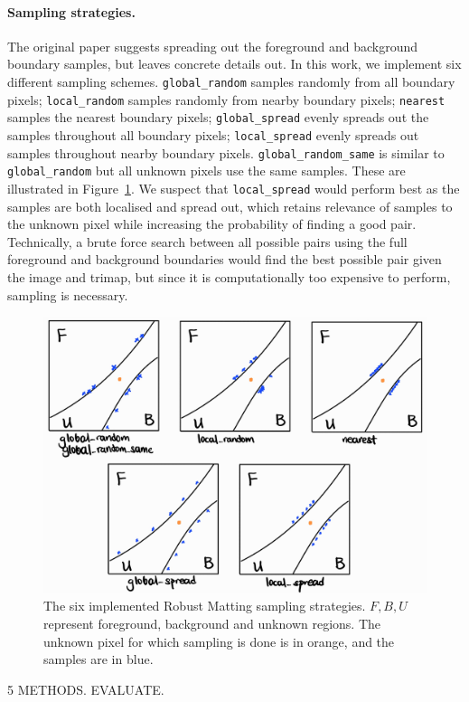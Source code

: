 \documentclass{article}
\begin{document}
\begin{multicols}{2}[]
\paragraph{Sampling strategies.}
The original paper suggests spreading out the foreground and background boundary samples, but leaves concrete details out. In this work, we implement six different sampling schemes. \verb|global_random| samples randomly from all boundary pixels; \verb|local_random| samples randomly from nearby boundary pixels; \verb|nearest| samples the nearest boundary pixels; \verb|global_spread| evenly spreads out the samples throughout all boundary pixels; \verb|local_spread| evenly spreads out samples throughout nearby boundary pixels. \verb|global_random_same| is similar to \verb|global_random| but all unknown pixels use the same samples. These are illustrated in Figure~\ref{fig:sampling}. We suspect that \verb|local_spread| would perform best as the samples are both localised and spread out, which retains relevance of samples to the unknown pixel while increasing the probability of finding a good pair. Technically, a brute force search between all possible pairs using the full foreground and background boundaries would find the best possible pair given the image and trimap, but since it is computationally too expensive to perform, sampling is necessary.
\begin{figure}[H]
    \centering
    \includegraphics[width=0.7\linewidth]{sampling}
    \caption{The six implemented Robust Matting sampling strategies. $F,B,U$ represent foreground, background and unknown regions. The unknown pixel for which sampling is done is in orange, and the samples are in blue.}
    \label{fig:sampling}
\end{figure}

5 METHODS. EVALUATE.






\end{multicols}
\end{document}
